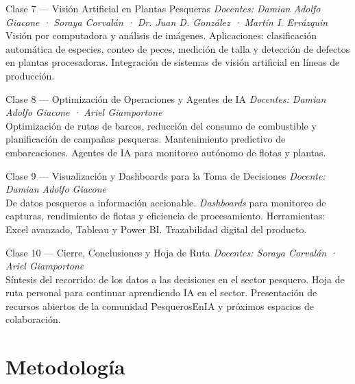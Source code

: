 \documentclass[12pt,a4paper]{article}
\begin{document}
\begin{clasebox}{Clase 7 — Visión Artificial en Plantas Pesqueras}
  \textit{Docentes: Damian Adolfo Giacone · Soraya Corvalán · Dr. Juan D. González · Martín I. Errázquin}\\[4pt]
  Visión por computadora y análisis de imágenes. Aplicaciones: clasificación automática de especies, conteo de peces, medición de talla y detección de defectos en plantas procesadoras. Integración de sistemas de visión artificial en líneas de producción.
\end{clasebox}

\begin{clasebox}{Clase 8 — Optimización de Operaciones y Agentes de IA}
  \textit{Docentes: Damian Adolfo Giacone · Ariel Giamportone}\\[4pt]
  Optimización de rutas de barcos, reducción del consumo de combustible y planificación de campañas pesqueras. Mantenimiento predictivo de embarcaciones. Agentes de IA para monitoreo autónomo de flotas y plantas.
\end{clasebox}

\begin{clasebox}{Clase 9 — Visualización y Dashboards para la Toma de Decisiones}
  \textit{Docente: Damian Adolfo Giacone}\\[4pt]
  De datos pesqueros a información accionable. \textit{Dashboards} para monitoreo de capturas, rendimiento de flotas y eficiencia de procesamiento. Herramientas: Excel avanzado, Tableau y Power BI. Trazabilidad digital del producto.
\end{clasebox}

\begin{clasebox}{Clase 10 — Cierre, Conclusiones y Hoja de Ruta}
  \textit{Docentes: Soraya Corvalán · Ariel Giamportone}\\[4pt]
  Síntesis del recorrido: de los datos a las decisiones en el sector pesquero. Hoja de ruta personal para continuar aprendiendo IA en el sector. Presentación de recursos abiertos de la comunidad PesquerosEnIA y próximos espacios de colaboración.
\end{clasebox}

\section{Metodología}
\end{document}
